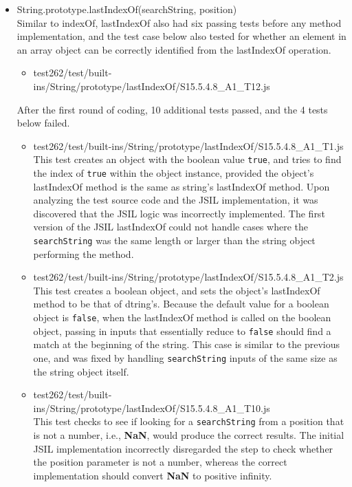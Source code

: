 \documentclass[a4paper,11pt,twoside]{report}
\def\jsinline{\lstinline[language=JavaScript, basicstyle=\small]}%\end{lstlisting}
\begin{document}
\begin{itemize}
\item String.prototype.lastIndexOf(searchString, position) \\
Similar to indexOf, lastIndexOf also had six passing tests before any method implementation, and the test case below also tested for whether an element in an array object can be correctly identified from the lastIndexOf operation.
\begin{itemize}
\item test262/test/built-ins/String/prototype/lastIndexOf/S15.5.4.8\_A1\_T12.js
\end{itemize}
After the first round of coding, 10 additional tests passed, and the 4 tests below failed. 
\begin{itemize}
\item test262/test/built-ins/String/prototype/lastIndexOf/S15.5.4.8\_A1\_T1.js \\
This test creates an object with the boolean value \texttt{true}, and tries to find the index of \texttt{true} within the object instance, provided the object's lastIndexOf method is the same as string's lastIndexOf method. Upon analyzing the test source code and the JSIL implementation, it was discovered that the JSIL logic was incorrectly implemented. The first version of the JSIL lastIndexOf could not handle cases where the \jsinline|searchString| was the same length or larger than the string object performing the method.
\item test262/test/built-ins/String/prototype/lastIndexOf/S15.5.4.8\_A1\_T2.js \\
This test creates a boolean object, and sets the object's lastIndexOf method to be that of dtring's. Because the default value for a boolean object is \texttt{false}, when the lastIndexOf method is called on the boolean object, passing in inputs that essentially reduce to \texttt{false} should find a match at the beginning of the string. This case is similar to the previous one, and was fixed by handling \jsinline|searchString| inputs of the same size as the string object itself.
\item test262/test/built-ins/String/prototype/lastIndexOf/S15.5.4.8\_A1\_T10.js \\
This test checks to see if looking for a \jsinline|searchString| from a position that is not a number, i.e., \textbf{NaN}, would produce the correct results. The initial JSIL implementation incorrectly disregarded the step to check whether the position parameter is not a number, whereas the correct implementation should convert \textbf{NaN} to positive infinity.

\end{itemize}
\end{itemize}
\end{document}
